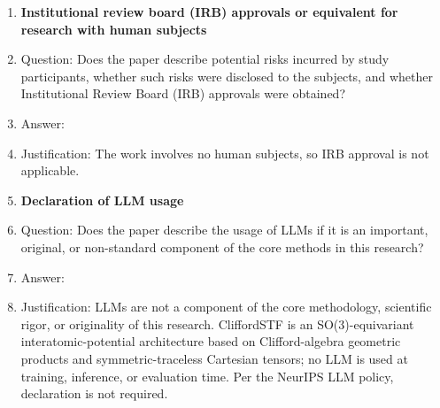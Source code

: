 \begin{enumerate}
\item {\bf Institutional review board (IRB) approvals or equivalent for research with human subjects}
    \item[] Question: Does the paper describe potential risks incurred by study participants, whether such risks were disclosed to the subjects, and whether Institutional Review Board (IRB) approvals were obtained?
    \item[] Answer: \answerNA{}
    \item[] Justification: The work involves no human subjects, so IRB approval is not applicable.

\item {\bf Declaration of LLM usage}
    \item[] Question: Does the paper describe the usage of LLMs if it is an important, original, or non-standard component of the core methods in this research?
    \item[] Answer: \answerNA{}
    \item[] Justification: LLMs are not a component of the core methodology, scientific rigor, or originality of this research. CliffordSTF is an SO(3)-equivariant interatomic-potential architecture based on Clifford-algebra geometric products and symmetric-traceless Cartesian tensors; no LLM is used at training, inference, or evaluation time. Per the NeurIPS LLM policy, declaration is not required.

\end{enumerate}